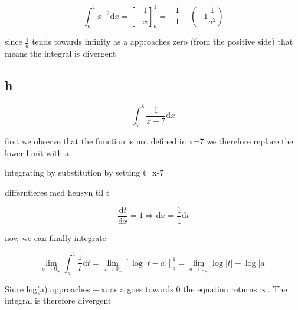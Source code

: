 \documentclass[12pt,a4paper]{article}
\begin{document}
\begin{equation} \label{}
\int_{a}^{1}x^{-2}\mathrm{d}x=\left[-\frac{1}{x}\right]_{a}^{1}=-\frac{1}{1}-(-1\frac{1}{a^2})
\end{equation}

since \begin{math}
\frac{1}{a}
\end{math} tends towards infinity as a approaches zero (from the positive side) that means the integral is divergent



\subsection{h}

\begin{equation} \label{}
\int_{7}^{8}\frac{1}{x-7}\mathrm{d}x
\end{equation}

first we observe that the function is not defined in x=7 we therefore replace the lower limit with a

integrating by substitution by setting t=x-7


differntieres med hensyn til t

\begin{equation} \label{}
\frac{\mathrm{d}t}{\mathrm{d}x}=1 \Rightarrow \mathrm{d}x=\frac{1}{1} \mathrm{d}t
\end{equation}



now we can finally integrate

\begin{equation} \label{}
\lim_{a\to0_+} \int_{a}^{1}\frac{1}{t} \mathrm{d}t=\lim_{a\to0_+}\left[\log{|t-a|}\right]_{a}^{1}=\lim_{a\to0_+}\log{|t|}-\log{|a|}
\end{equation}

Since log(a) approaches $-\infty$ as a goes towards 0 the equation returns $\infty$. The integral is therefore divergent
\end{document}
